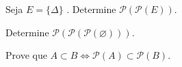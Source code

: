 \item  Seja $E = \{\Delta\}$ . Determine $\mathcal{P}(\mathcal{P}(E))$.
\item Determine $\mathcal{P}(\mathcal{P}(\mathcal{P}( \varnothing )))$.
\item Prove que $A \subset B \Leftrightarrow \mathcal{P}(A) \subset \mathcal{P}(B).$
